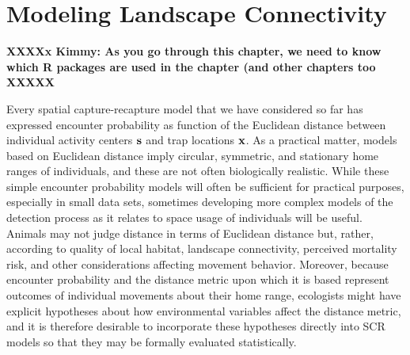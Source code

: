 \chapter{
Modeling Landscape Connectivity
}
\label{chapt.ecoldist}


\vspace{.3in}

{\bf XXXXx Kimmy: As you go through this chapter, we need to know
  which R packages are used in the chapter (and other chapters too XXXXX}

Every spatial capture-recapture model that we have considered so far
has expressed encounter probability as function of the Euclidean
distance between individual activity centers ${\bf s}$ and trap
locations ${\bf x}$.  As a practical matter, models based on Euclidean
distance imply circular, symmetric, and stationary home ranges of
individuals, and these are not often biologically realistic.  While
these simple encounter probability models will often be sufficient for
practical purposes, especially in small data sets, sometimes
developing more complex models of the detection process as it relates
to space usage of individuals will be useful.  Animals may not judge
distance in terms of Euclidean distance but, rather, according to
quality of local habitat, landscape connectivity, perceived mortality
risk, and other considerations affecting movement behavior.  Moreover,
because encounter probability and the distance metric upon which it is
based represent outcomes of individual movements about their home
range, ecologists might have explicit hypotheses about how
environmental variables affect the distance metric, and it is
therefore desirable to incorporate these hypotheses directly into SCR
models so that they may be formally evaluated statistically.

